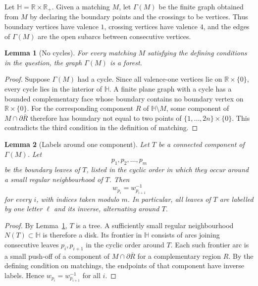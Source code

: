 \documentclass[12pt]{article}
\newtheorem{lemma}{Lemma}
\newcommand{\HH}{\mathbb H}
\newcommand{\bd}{\partial}
\begin{document}
Let \(\HH=\mathbb R\times \mathbb R_+\).  Given a matching \(M\), let \(\Gamma(M)\) be the finite graph obtained from \(M\) by declaring the boundary points and the crossings to be vertices.  Thus boundary vertices have valence \(1\), crossing vertices have valence \(4\), and the edges of \(\Gamma(M)\) are the open subarcs between consecutive vertices.

\begin{lemma}[No cycles]\label{lem:forest}
For every matching \(M\) satisfying the defining conditions in the question, the graph \(\Gamma(M)\) is a forest.
\end{lemma}

\begin{proof}
Suppose \(\Gamma(M)\) had a cycle.  Since all valence-one vertices lie on \(\mathbb R\times\{0\}\), every cycle lies in the interior of \(\HH\).  A finite plane graph with a cycle has a bounded complementary face whose boundary contains no boundary vertex on \(\mathbb R\times\{0\}\).  For the corresponding component \(R\) of \(\HH\setminus M\), some component of \(M\cap \bd \overline R\) therefore has boundary not equal to two points of \(\{1,\dots,2n\}\times\{0\}\).  This contradicts the third condition in the definition of matching.
\end{proof}

\begin{lemma}[Labels around one component]\label{lem:cycliclabels}
Let \(T\) be a connected component of \(\Gamma(M)\).  Let
\[
p_1,p_2,\dots,p_m
\]
be the boundary leaves of \(T\), listed in the cyclic order in which they occur around a small regular neighbourhood of \(T\).  Then
\[
w_{p_i}=w_{p_{i+1}}^{-1}
\]
for every \(i\), with indices taken modulo \(m\).  In particular, all leaves of \(T\) are labelled by one letter \(\ell\) and its inverse, alternating around \(T\).
\end{lemma}

\begin{proof}
By Lemma~\ref{lem:forest}, \(T\) is a tree.  A sufficiently small regular neighbourhood \(N(T)\subset \HH\) is therefore a disk.  Its frontier in \(\HH\) consists of arcs joining consecutive leaves \(p_i,p_{i+1}\) in the cyclic order around \(T\).  Each such frontier arc is a small push-off of a component of \(M\cap \bd\overline R\) for a complementary region \(R\).  By the defining condition on matchings, the endpoints of that component have inverse labels.  Hence \(w_{p_i}=w_{p_{i+1}}^{-1}\) for all \(i\).
\end{proof}
\end{document}
